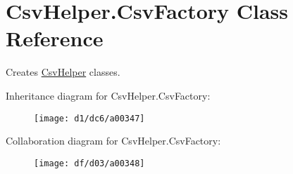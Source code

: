\hypertarget{a00043}{\section{Csv\-Helper.\-Csv\-Factory Class Reference}
\label{a00043}
}


Creates \hyperlink{a00281}{Csv\-Helper} classes.  




Inheritance diagram for Csv\-Helper.\-Csv\-Factory\-:
\nopagebreak
\begin{figure}[H]
\begin{center}
\leavevmode
\texttt{[image: d1/dc6/a00347]}
\end{center}
\end{figure}


Collaboration diagram for Csv\-Helper.\-Csv\-Factory\-:
\nopagebreak
\begin{figure}[H]
\begin{center}
\leavevmode
\texttt{[image: df/d03/a00348]}
\end{center}
\end{figure}
